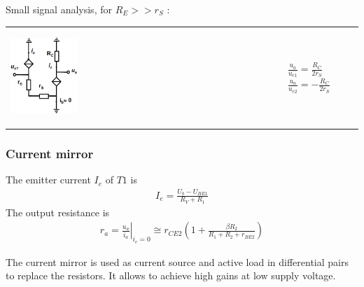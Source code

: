 		
			Small signal analysis, for $R_E >> r_S$ : \\
			\begin{table}[h!]
				\centering
				\begin{tabular}{m{} m{} }
					
					\begin{center}\includegraphics[width=0.25\textwidth]{images/Differenzverstaerker2.png}\end{center} 
				&
							
					$\frac{u_a}{u_{e1}} = \frac{R_C}{2 r_S}$\newline
					$\frac{u_a}{u_{e2}} = -\frac{R_C}{2 r_S}$

				\\
			
				\end{tabular}
			\end{table}				

	
		\subsubsection{Current mirror}
			\begin{multicols}{2}
				\begin{center}
					
				\end{center}
				\vfill
				\columnbreak
				The emitter current $I_e$ of $T1$ is
				\begin{align}
					I_e = \frac{U_b - U_{BE1}}{R_V + R_1}
				\end{align}
				The output resistance is
				\begin{align}
					r_a = \left.\frac{u_a}{i_a}\right|_{i_e=0} \cong r_{CE2} \left( 1 + \frac{\beta R_2}{R_1 + R_2 + r_{BE2}} \right)
				\end{align}
			\end{multicols}
			
			The current mirror is used as current source and active load in differential pairs to replace the resistors. 
			It allows to achieve high gains at low supply voltage.
		
		\newpage
